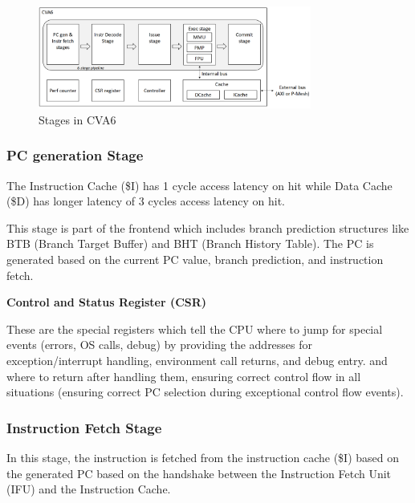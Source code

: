 \documentclass[12pt, a4paper]{article}
\begin{document}
\begin{figure}[h]
    \centering
    \includegraphics[width=0.8\textwidth]{CVA6 Stages.png}
    \caption{Stages in CVA6}
    \label{fig:cva6_stages}
\end{figure}

\subsubsection{PC generation Stage}

\vspace{0.5em}

The Instruction Cache (\$I) has 1 cycle access latency on hit while Data Cache (\$D) has longer latency of 3 cycles access latency on hit.

This stage is part of the frontend which includes branch prediction structures like BTB (Branch Target Buffer) and BHT (Branch History Table). The PC is generated based on the current PC value, branch prediction, and instruction fetch. 

\vspace{0.5em}

\textbf{Control and Status Register (CSR)}

These are the special registers which tell the CPU where to jump for special events (errors, OS calls, debug) by providing the addresses for exception/interrupt handling, environment call returns, and debug entry. and where to return after handling them, ensuring correct control flow in all situations (ensuring correct PC selection during exceptional control flow events).

\vspace{0.5em}

\subsubsection{Instruction Fetch Stage}

In this stage, the instruction is fetched from the instruction cache (\$I) based on the generated PC based on the handshake between the Instruction Fetch Unit (IFU) and the Instruction Cache. 
\end{document}
